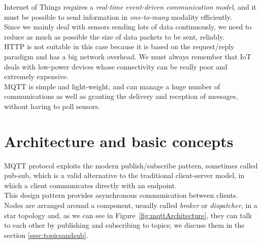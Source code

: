\documentclass[12pt]{report}
\begin{document}

\bigskip
{\setlength{\parindent}{0cm}
Internet of Things requires a \emph{real-time event-driven communication model}, and it must be possible to send information in \emph{one-to-many} modality efficiently.\\
Since we mainly deal with sensors sending lots of data continuously, we need to reduce as much as possible the size of data packets to be sent, reliably.\\

HTTP is not suitable in this case because it is based on the request/reply paradigm and has a big network overhead. We must always remember that IoT deals with low-power devices whose connectivity can be really poor and extremely expensive.\\

MQTT is simple and light-weight, and can manage a huge number of communications as well as granting the delivery and reception of messages, without having to poll sensors.\\

}


\section{Architecture and basic concepts}

\label{ssec:pubsubpattern}
\bigskip
MQTT protocol exploits the modern publish/subscribe pattern, sometimes called pub-sub, which is a valid alternative to the traditional client-server model, in which a client communicates directly with an endpoint.\\
This design pattern provides asynchronous communication between clients.\\
Nodes are arranged around a component, usually called \emph{broker} or \emph{dispatcher}, in a star topology and, as we can see in Figure~\ref{fig:mqttArchitecture}, they can talk to each other by publishing and subscribing to topics; we discuss them in the section \ref{ssec:topicsandsub}.
\end{document}
